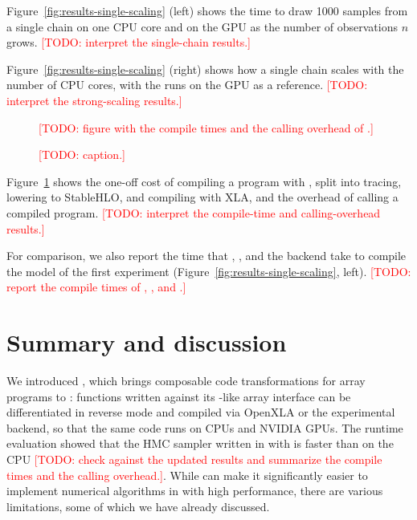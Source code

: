 \documentclass[article,shortnames]{jss}
\begin{document}
Figure~\ref{fig:results-single-scaling} (left) shows the time to draw 1000 samples from a single chain on one CPU core and on the GPU as the number of observations $n$ grows.
\textcolor{red}{[TODO: interpret the single-chain results.]}

Figure~\ref{fig:results-single-scaling} (right) shows how a single chain scales with the number of CPU cores, with the runs on the GPU as a reference.
\textcolor{red}{[TODO: interpret the strong-scaling results.]}

\begin{figure}[tbp]
\centering
\textcolor{red}{[TODO: figure with the compile times and the calling overhead of .]}
\caption{\textcolor{red}{[TODO: caption.]}}
\label{fig:results-overhead}
\end{figure}

Figure~\ref{fig:results-overhead} shows the one-off cost of compiling a program with , split into tracing, lowering to StableHLO, and compiling with XLA, and the overhead of calling a compiled program.
\textcolor{red}{[TODO: interpret the compile-time and calling-overhead results.]}

For comparison, we also report the time that , , and the  backend take to compile the model of the first experiment (Figure~\ref{fig:results-single-scaling}, left).
\textcolor{red}{[TODO: report the compile times of , , and .]}

\section{Summary and discussion}\label{discussion}

We introduced , which brings composable code transformations for array programs to : functions written against its -like array interface can be differentiated in reverse mode and compiled via OpenXLA or the experimental  backend, so that the same  code runs on CPUs and NVIDIA GPUs.
The runtime evaluation showed that the HMC sampler written in  with  is faster than  on the CPU \textcolor{red}{[TODO: check against the updated results and summarize the compile times and the calling overhead.]}.
While  can make it significantly easier to implement numerical algorithms in  with high performance, there are various limitations, some of which we have already discussed.
\end{document}
